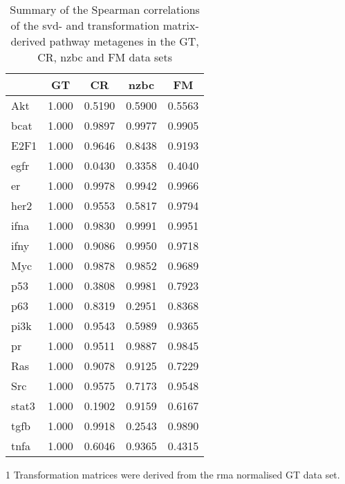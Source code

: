 \begin{table}[tpb]
	\centering
	\begin{threeparttable}
	\caption[Summary of the Spearman correlations of the \gls{svd}- and TM-derived pathway metagenes in the GT, CR, \gls{nzbc} and FM data sets]{Summary of the Spearman correlations of the \gls{svd}- and transformation matrix-derived pathway metagenes in the GT, CR, \gls{nzbc} and FM data sets}
	\label{tab:svd_vs_tm_path}
		\begin{tabular}{lcccc}
			& GT & CR & \gls{nzbc} & FM\\
			\hline
			\hline
			\rule{0pt}{2.25ex}Akt & 1.000 & 0.5190 & 0.5900 & 0.5563 \\
			\gls{bcat}            & 1.000 & 0.9897 & 0.9977 & 0.9905 \\
			E2F1                  & 1.000 & 0.9646 & 0.8438 & 0.9193 \\
			\gls{egfr}            & 1.000 & 0.0430 & 0.3358 & 0.4040 \\
			\gls{er}              & 1.000 & 0.9978 & 0.9942 & 0.9966 \\
			\gls{her2}            & 1.000 & 0.9553 & 0.5817 & 0.9794 \\
			\gls{ifna}            & 1.000 & 0.9830 & 0.9991 & 0.9951 \\
			\gls{ifny}            & 1.000 & 0.9086 & 0.9950 & 0.9718 \\
			Myc                   & 1.000 & 0.9878 & 0.9852 & 0.9689 \\
			p53                   & 1.000 & 0.3808 & 0.9981 & 0.7923 \\
			p63                   & 1.000 & 0.8319 & 0.2951 & 0.8368 \\
			\gls{pi3k}            & 1.000 & 0.9543 & 0.5989 & 0.9365 \\
			\gls{pr}              & 1.000 & 0.9511 & 0.9887 & 0.9845 \\
			Ras                   & 1.000 & 0.9078 & 0.9125 & 0.7229 \\
			Src                   & 1.000 & 0.9575 & 0.7173 & 0.9548 \\
			\gls{stat3}           & 1.000 & 0.1902 & 0.9159 & 0.6167 \\
			\gls{tgfb}            & 1.000 & 0.9918 & 0.2543 & 0.9890 \\
			\gls{tnfa}            & 1.000 & 0.6046 & 0.9365 & 0.4315 \\
			\hline
			\hline
		\end{tabular}
		\begin{tablenotes}
			\begin{footnotesize}
				\item [1] Transformation matrices were derived from the \gls{rma} normalised GT data set.
			\end{footnotesize}
		\end{tablenotes}
	\end{threeparttable}
\end{table}

